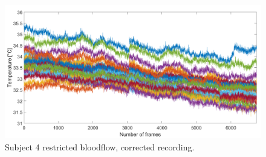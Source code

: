 \begin{figure}[htbp]
\begin{minipage}[b]{0.45\linewidth}
	\end{minipage}
	\hspace{0.2cm}
	\begin{minipage}[b]{0.45\linewidth}
		\centering
		\includegraphics[width=\linewidth]{figures/Recordings/Sub4_cuffed_corr}
		\caption{Subject 4 restricted bloodflow, corrected recording.}
	
	\end{minipage}
\end{figure}